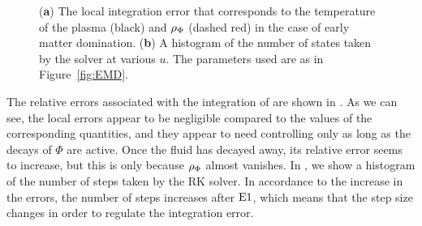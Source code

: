 \documentclass[11pt,a4paper]{article}
\begin{document}
\begin{figure}[t]
\begin{subfigure}{0.5\textwidth}
		\caption{}
		\label{fig:EMD_hist}
	\end{subfigure}
	\caption{			
		({\bfseries a}) The local integration error that corresponds to the temperature of the plasma (black) and $\rho_{\Phi}$ (dashed red) in the case of early matter domination. 
		({\bfseries b}) A histogram of the number of states taken by the solver at various $u$.
		The parameters used are as in Figure~\ref{fig:EMD}.
	}
	\label{fig:error_examples_MD}
\end{figure}
%
The relative errors associated with the integration of  are shown in . As we can see, the local errors appear to be negligible compared to the values of the corresponding quantities, and they appear to need controlling only as long as the decays of $\Phi$ are active. Once the fluid has decayed away, its relative error seems to increase, but this is only because $\rho_{\Phi}$ almost vanishes.
%
In , we show a histogram of the number of steps taken by the RK solver. In accordance to the increase in the errors, the number of steps increases after ${\rm E1}{}$, which means that the step size changes in order to regulate the integration error.
\end{document}
